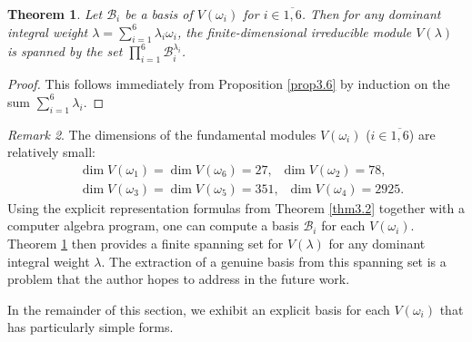 \documentclass[12pt]{article}
\numberwithin{equation}{section}
\newtheorem{theorem}{Theorem}[section]
\theoremstyle{definition}
\theoremstyle{remark}
\newtheorem{remark}[theorem]{Remark}
\begin{document}
\begin{theorem}\label{thmspan}
	Let $\mathcal{B}_i$ be a basis of $V(\omega_i)$ for $i\in\overline{1,6}$. Then for any dominant integral weight $\lambda=\sum_{i=1}^6\lambda_i\omega_i$, the finite-dimensional irreducible module $V(\lambda)$ is spanned by the set $\prod_{i=1}^6\mathcal{B}_i^{\lambda_i}$.
\end{theorem}
\begin{proof}
	This follows immediately from Proposition \ref{prop3.6} by induction on the sum $\sum_{i=1}^6{\lambda_i}$.
\end{proof}

\begin{remark}
	The dimensions of the fundamental modules $V(\omega_i)$ ($i\in\overline{1,6}$) are relatively small:
	\begin{eqnarray}
		&\dim V(\omega_1)=\dim V(\omega_6)=27,\;\;\dim V(\omega_2)=78,\\
		&\dim V(\omega_3)=\dim V(\omega_5)=351,\;\;\dim V(\omega_4)=2925.
	\end{eqnarray}
	Using the explicit representation formulas from Theorem \ref{thm3.2} together with a computer algebra program, one can compute a basis $\mathcal{B}_i$ for each $V(\omega_i)$. Theorem \ref{thmspan} then provides a finite spanning set for $V(\lambda)$ for any dominant integral weight $\lambda$. The extraction of a genuine basis from this spanning set is a problem that the author hopes to address in the future work.
\end{remark}
In the remainder of this section, we exhibit an explicit basis for each $V(\omega_i)$ that has particularly simple forms.
\end{document}
